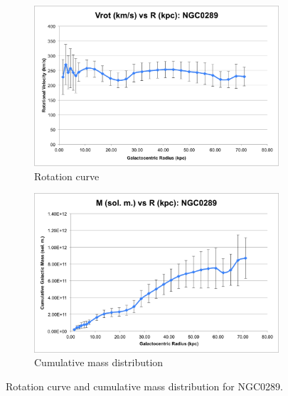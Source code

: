 \documentclass{article}
\begin{document}
\begin{figure}
    \centering
    \begin{subfigure}{0.4\textwidth}
        \includegraphics[width=\textwidth]{vrot/Vrot-2}
        \caption{Rotation curve}
    \end{subfigure}
    \hfill
    \begin{subfigure}{0.4\textwidth}
        \includegraphics[width=\textwidth]{m/M-2}
        \caption{Cumulative mass distribution}
    \end{subfigure}
    \caption{Rotation curve and cumulative mass distribution for NGC0289.}
    \label{fig:ngc0289}
\end{figure}
\end{document}
